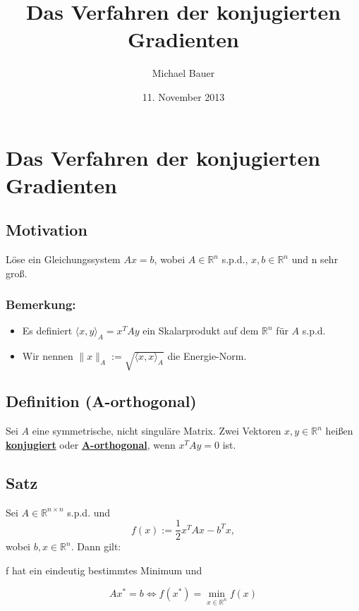 \documentclass{article}
\title{Das Verfahren der konjugierten Gradienten}
\author{Michael Bauer}
\date{11. November 2013}
\begin{document}
\maketitle
\tableofcontents
\newpage
\large

\section*{Das Verfahren der konjugierten Gradienten}

\subsection{Motivation}
Löse ein Gleichungssystem $Ax = b$, wobei $A\in\mathbb{R}^{n}$ s.p.d., $x, b\in\mathbb{R}^{n}$ und n sehr groß.

\subsubsection{Bemerkung:}
\begin{itemize}
\item Es definiert $\langle x,y \rangle _{A} = x^{T}Ay$ ein Skalarprodukt auf dem $\mathbb{R}^{n}$ für $A$ s.p.d.
\item Wir nennen $\|x\|_{A} := \sqrt{\langle x, x \rangle _{A}}$ die Energie-Norm.
\end{itemize}

\subsection{Definition (A-orthogonal)}
Sei $A$ eine symmetrische, nicht singuläre Matrix. Zwei Vektoren $x,y \in \mathbb{R}^{n}$ heißen \underline{\textbf{konjugiert}} oder \underline{\textbf{A-orthogonal}}, wenn $x^{T}Ay = 0$ ist.

\subsection{Satz}
Sei $A\in\mathbb{R}^{n \times n}$ s.p.d. und
\begin{equation}
f(x) := \frac 1 2 x^{T}Ax - b^{T}x,
\end{equation}
wobei $b,x \in \mathbb{R}^{n}$. Dann gilt:
\begin{center}
f hat ein eindeutig bestimmtes Minimum und
\end{center}
\begin{equation}
Ax^{*} = b \Longleftrightarrow f(x^{*}) = \underset{x\in\mathbb{R}^{n}}{\min} f(x)
\end{equation}
\end{document}
